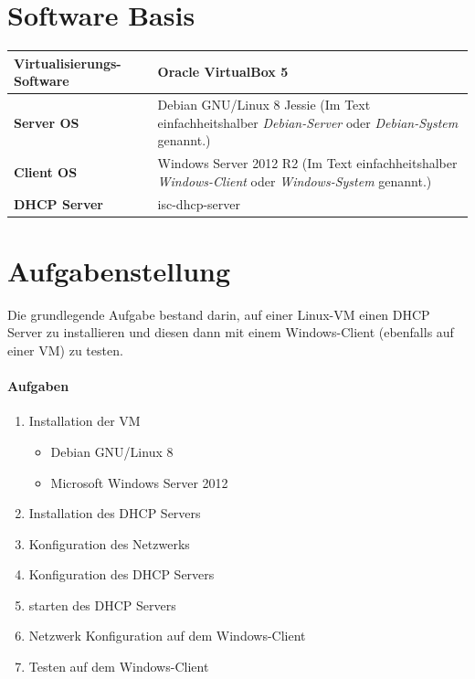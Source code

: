\documentclass[12pt,a4paper,twoside,titlepage]{article}
\title{\titleText}
\author{\authorText}
\date{\dateText}
\begin{document}
	\maketitle
	\tableofcontents

        \section{Software Basis}

        \begin{tabular}{|l|p{7cm}|}
          \hline
          \textbf{Virtualisierungs-Software} & Oracle VirtualBox 5\\\hline
          \textbf{Server OS} & Debian GNU/Linux 8 Jessie (Im Text einfachheitshalber \textit{Debian-Server} oder \textit{Debian-System} genannt.)\\\hline
          \textbf{Client OS} & Windows Server 2012 R2 (Im Text einfachheitshalber \textit{Windows-Client} oder \textit{Windows-System} genannt.) \\\hline
          \textbf{DHCP Server} & isc-dhcp-server \\\hline
        \end{tabular}

        \section{Aufgabenstellung}

        Die grundlegende Aufgabe bestand darin, auf einer Linux-VM einen DHCP Server zu installieren und diesen dann mit einem Windows-Client (ebenfalls auf einer VM) zu testen.

        \paragraph{Aufgaben}
        \begin{enumerate}
        \item Installation der VM
          \begin{itemize}
          \item Debian GNU/Linux 8
          \item Microsoft Windows Server 2012
          \end{itemize}
        \item Installation des DHCP Servers
        \item Konfiguration des Netzwerks
        \item Konfiguration des DHCP Servers
        \item starten des DHCP Servers
        \item Netzwerk Konfiguration auf dem Windows-Client
        \item Testen auf dem Windows-Client
        \end{enumerate}
\end{document}
